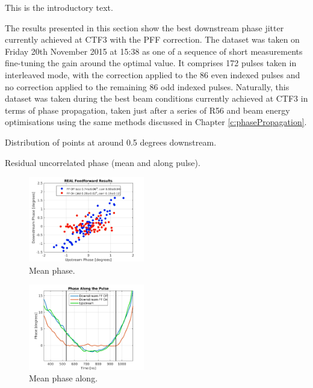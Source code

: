 
This is the introductory text.



The results presented in this section show the best downstream phase jitter currently achieved at CTF3 with the PFF correction. The dataset was taken on Friday 20th November 2015 at 15:38 as one of a sequence of short measurements fine-tuning the gain around the optimal value. It comprises 172 pulses taken in interleaved mode, with the correction applied to the 86 even indexed pulses and no correction applied to the remaining 86 odd indexed pulses. Naturally, this dataset was taken during the best beam conditions currently achieved at CTF3 in terms of phase propagation, taken just after a series of R56 and beam energy optimisations using the same methods discussed in Chapter \ref{c:phasePropagation}.

Distribution of points at around 0.5 degrees downstream.

Residual uncorrelated phase (mean and along pulse).

\begin{figure}
  \centering
  \includegraphics[width=0.45\textwidth]{Figures/BestFF_Real}
  \caption{Mean phase.}
  \label{f:BestFF_Real}
\end{figure}

\begin{figure}
  \centering
  \includegraphics[width=0.45\textwidth]{Figures/BestFF_MeanPhaseAlong}
  \caption{Mean phase along.}
  \label{f:BestFF_MeanPhaseAlong}
\end{figure}

